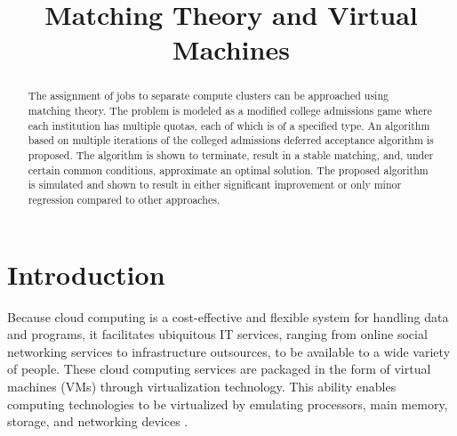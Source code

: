 \documentclass[conference]{IEEEtran}
\begin{document}
%
\title{Matching Theory and Virtual Machines}


\author{
\and
{}
}


\maketitle


\begin{abstract}
The assignment of jobs to separate compute clusters 
can be approached using matching theory. 
The problem is modeled as a modified college admissions
game where each institution has multiple quotas,
each of which is of a specified type.
An algorithm based on multiple iterations of the 
colleged admissions deferred acceptance algorithm is 
proposed.
The algorithm is shown to terminate, result in 
a stable matching, and, under certain common conditions,
approximate an optimal solution.
The proposed algorithm is simulated 
and shown to result in either significant improvement 
or only minor regression compared to other approaches.
\end{abstract}


\section{Introduction}
\label{sec:intro}
Because cloud computing is a cost-effective
and flexible system for handling data and programs,
it facilitates ubiquitous IT services,
ranging from online social networking services to infrastructure
outsources, to be available to a wide variety of people.  
These cloud computing services are packaged in the form of
virtual machines (VMs) through virtualization technology.
This ability enables computing technologies
to be virtualized by emulating processors, main memory, storage,
and networking devices \cite{wen_virtualknotter:_2012}.  
\end{document}
